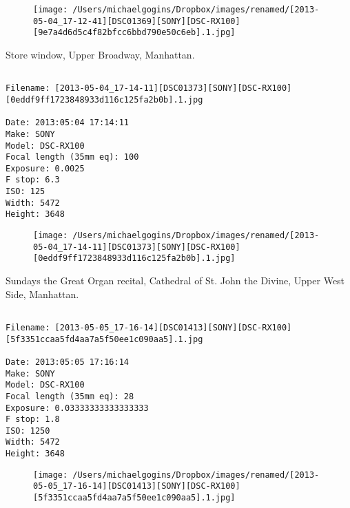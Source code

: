 \documentclass[11pt,letter,DIV=14,paper=landscape]{scrbook}
\begin{document}
\begin{figure}
\texttt{[image: /Users/michaelgogins/Dropbox/images/renamed/[2013-05-04\_17-12-41][DSC01369][SONY][DSC-RX100][9e7a4d6d5c4f82bfcc6bbd790e50c6eb].1.jpg]}
\end{figure}
    
\clearpage
\noindent Store window, Upper Broadway, Manhattan.
\noindent
\begin{lstlisting}

Filename: [2013-05-04_17-14-11][DSC01373][SONY][DSC-RX100][0eddf9ff1723848933d116c125fa2b0b].1.jpg

Date: 2013:05:04 17:14:11
Make: SONY
Model: DSC-RX100
Focal length (35mm eq): 100
Exposure: 0.0025
F stop: 6.3
ISO: 125
Width: 5472
Height: 3648
\end{lstlisting}
\clearpage

\begin{figure}
\texttt{[image: /Users/michaelgogins/Dropbox/images/renamed/[2013-05-04\_17-14-11][DSC01373][SONY][DSC-RX100][0eddf9ff1723848933d116c125fa2b0b].1.jpg]}
\end{figure}
    
\clearpage
\noindent Sundays the Great Organ recital, Cathedral of St. John the Divine, Upper West Side, Manhattan.
\noindent
\begin{lstlisting}

Filename: [2013-05-05_17-16-14][DSC01413][SONY][DSC-RX100][5f3351ccaa5fd4aa7a5f50ee1c090aa5].1.jpg

Date: 2013:05:05 17:16:14
Make: SONY
Model: DSC-RX100
Focal length (35mm eq): 28
Exposure: 0.03333333333333333
F stop: 1.8
ISO: 1250
Width: 5472
Height: 3648
\end{lstlisting}
\clearpage

\begin{figure}
\texttt{[image: /Users/michaelgogins/Dropbox/images/renamed/[2013-05-05\_17-16-14][DSC01413][SONY][DSC-RX100][5f3351ccaa5fd4aa7a5f50ee1c090aa5].1.jpg]}
\end{figure}
    
\end{document}
